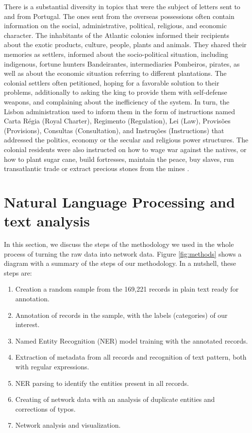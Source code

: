 \documentclass{article}
\begin{document}
There is a substantial diversity in topics that were the subject of letters sent to and from Portugal. The ones sent from the overseas possessions often contain information on the social, administrative, political, religious, and economic character. The inhabitants of the Atlantic colonies informed their recipients about the exotic products, culture, people, plants and animals. They shared their memories as settlers, informed about the socio-political situation, including indigenous, fortune hunters Bandeirantes, intermediaries Pombeiros, pirates, as well as about the economic situation referring to different plantations. The colonial settlers often petitioned, hoping for a favorable solution to their problems, additionally to asking the king to provide them with self-defense weapons, and complaining about the inefficiency of the system. In turn, the Lisbon administration used to inform them in the form of instructions named Carta Régia (Royal Charter), Regimento (Regulation), Lei (Law), Provisões (Provisions), Consultas (Consultation), and Instruções (Instructions) that addressed the politics, economy or the secular and religious power structures. The colonial residents were also instructed on how to wage war against the natives, or how to plant sugar cane, build fortresses, maintain the peace, buy slaves, run transatlantic trade or extract precious stones from the mines \cite{boschi_o_2011}.

\section{Natural Language Processing and text analysis}

In this section, we discuss the steps of the methodology we used in the whole process of turning the raw data into network data. Figure \ref{fig:methods} shows a diagram with a summary of the steps of our methodology. In a nutshell, these steps are:
\begin{enumerate}
	\item Creation a random sample from the 169,221 records in plain text ready for annotation.
	\item Annotation of records in the sample, with the labels (categories) of our interest.
	\item Named Entity Recognition (NER) model training with the annotated records.
	\item Extraction of metadata from all records and recognition of text pattern, both with regular expressions.
	\item NER parsing to identify the entities present in all records.
	\item Creating of network data with an analysis of duplicate entities and corrections of typos.
	\item Network analysis and visualization.
\end{enumerate}
\end{document}
